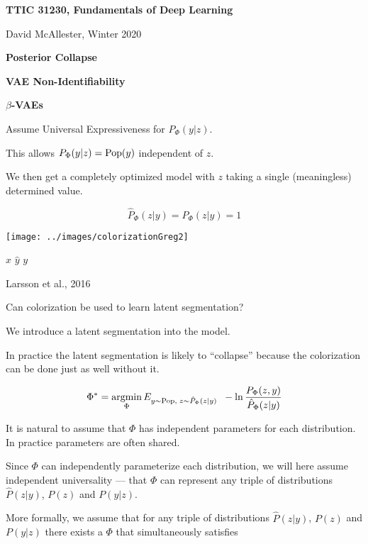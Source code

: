 





{\Huge

  \centerline{\bf TTIC 31230, Fundamentals of Deep Learning}
  \bigskip
  \centerline{David McAllester, Winter 2020}
  \vfill
  \vfil
  \centerline{\bf Posterior Collapse}
  \vfill
  \centerline{\bf VAE Non-Identifiability}
  \vfill
  \centerline{\bf $\beta$-VAEs}
  \vfill
  \vfill


Assume Universal Expressiveness for $P_\Phi(y|z)$.

\vfill
This allows $P_\Phi(y|z) = \mathrm{Pop}(y)$ independent of $z$.

\vfill
We then get a completely optimized model with $z$ taking a single (meaningless) determined value.

\vfill
$$\hat{P}_\Phi(z|y) = P_\Phi(z|y) = 1$$

\medskip
\centerline{\texttt{[image: ../images/colorizationGreg2]}}
\centerline{$x$ \hspace{4em} $\hat{y}$ \hspace{4em} $y$}
\centerline{\huge Larsson et al., 2016}

\vfill
Can colorization be used to learn latent segmentation?

\vfill
We introduce a latent segmentation into the model.

\vfill
In practice the latent segmentation is likely to ``collapse'' because the colorization can be done just as well without it.



$$\Phi^* = \operatorname*{argmin}_\Phi E_{y\sim \mathrm{Pop},\;z \sim \hat{P}_\Phi(z|y)}\;\;-\ln \frac{P_\Phi(z,y)}{\hat{P}_\Phi(z|y)}$$

\vfill
It is natural to assume  that $\Phi$ has independent parameters for each distribution.  In practice parameters are often shared.

\vfill
Since $\Phi$ can independently parameterize each distribution, we will here assume independent universality ---
that $\Phi$ can represent any triple of distributions $\hat{P}(z|y)$, $P(z)$ and $P(y|z)$.



More formally, we assume that for any triple of distributions $\hat{P}(z|y)$, $P(z)$ and $P(y|z)$ there exists a $\Phi$ that {\color{red} simultaneously} satisfies

}
